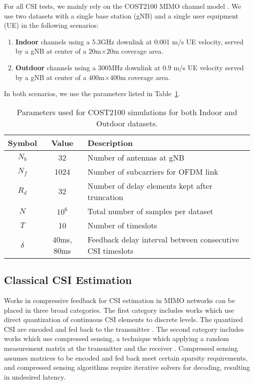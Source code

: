 For all CSI tests, we mainly rely on the COST2100 MIMO channel model \cite{ref:liu2012cost2100}. We use two datasets with a single base station (gNB) and a single user equipment (UE) in the following scenarios:
\begin{enumerate}
	\item \textbf{Indoor} channels using a 5.3GHz downlink at
	0.001 m/s UE velocity, served by a
	gNB at center of a $20$m$\times 20$m coverage area.
	\item \textbf{Outdoor} channels using a 300MHz downlink at 0.9 m/s UE velocity served by a gNB at center 
	of a $400$m$\times 400$m coverage area.
\end{enumerate}
In both scenarios, we use the parameters listed in Table~\ref{tab:cost-params}.
\begin{table}[]
\centering
\caption{Parameters used for COST2100 simulations for both Indoor and Outdoor datasets.}
\label{tab:cost-params}
\begin{tabular}{c|c|l}
\toprule
\textbf{Symbol} & \textbf{Value} & \textbf{Description} \\ \midrule
$N_b$ 			& 32			 & Number of antennas at gNB  \\ \hline
$N_f$ 			& 1024			 & Number of subcarriers for OFDM link  \\ \hline
$R_d$ 			& 32			 & Number of delay elements kept after truncation  \\ \hline
$N$ 			& $10^6$		 & Total number of samples per dataset  \\ \hline
$T$ 			& 10		 	 & Number of timeslots  \\ \hline
$\delta$		& 40ms, 80ms	 & Feedback delay interval between consecutive CSI timeslots  \\ \bottomrule
\end{tabular}
\end{table}

\subsection{Classical CSI Estimation}

Works in compressive feedback for CSI estimation in MIMO networks can be placed in three broad categories. The first category includes works which use direct quantization of continuous CSI elements to discrete levels. The quantized CSI are encoded and fed back to the transmitter \cite{ref:makki2012hybrid,ref:shirani2009channel}. The second category includes works which use compressed sensing, a technique which applying a random measurement matrix at the transmitter and the receiver \cite{ref:rao2014distributed, ref:eltayeb2014compressive}. Compressed sensing assumes matrices to be encoded and fed back meet certain sparsity requirements, and compressed sensing algorithms require iterative solvers \cite{ref:do2008sparsity} for decoding, resulting in undesired latency.

